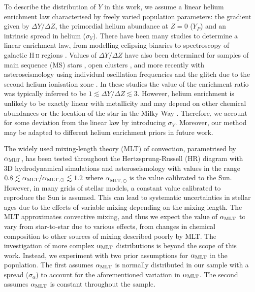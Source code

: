 To describe the distribution of $Y$ in this work, we assume a linear helium enrichment law characterised by freely varied population parameters: the gradient given by $\Delta Y / \Delta Z$, the primordial helium abundance at $Z=0$ ($Y_P$) and an intrinsic spread in helium ($\sigma_Y$). There have been many studies to determine a linear enrichment law, from modelling eclipsing binaries \citep{Ribas.Jordi.ea2000} to spectroscopy of galactic H\,\textsc{ii} regions \citep{Balser2006}. Values of $\Delta Y / \Delta Z$ have also been determined for samples of main sequence (MS) stars \citep{Casagrande.Flynn.ea2007}, open clusters \citep{Brogaard.VandenBerg.ea2012}, and more recently with asteroseismology using individual oscillation frequencies \citep{SilvaAguirre.Lund.ea2017} and the glitch due to the second helium ionisation zone \citep{Verma.Raodeo.ea2019}. In these studies the value of the enrichment ratio was typically inferred to be $1 \lesssim \Delta Y / \Delta Z \lesssim 3$. However, helium enrichment is unlikely to be exactly linear with metallicity and may depend on other chemical abundances \citep{West.Heger2013} or the location of the star in the Milky Way \citep{Frebel2010}. Therefore, we account for some deviation from the linear law by introducing $\sigma_Y$. Moreover, our method may be adapted to different helium enrichment priors in future work.

The widely used mixing-length theory (MLT) of convection, parametrised by ${\alpha_\mathrm{MLT}}$, has been tested throughout the Hertzsprung-Russell (HR) diagram with 3D hydrodynamical simulations \citep{Trampedach.Stein.ea2014, Magic.Weiss.ea2015} and asteroseismology \citep{Tayar.Somers.ea2017, Viani.Basu.ea2018, Li.Bedding.ea2018} with values in the range $0.8 \lesssim {\alpha_\mathrm{MLT}}/\alpha_{\mathrm{MLT}, \odot} \lesssim 1.2$ where $\alpha_{\mathrm{MLT}, \odot}$ is the value calibrated to the Sun. However, in many grids of stellar models, a constant value calibrated to reproduce the Sun is assumed. This can lead to systematic uncertainties in stellar ages due to the effects of variable mixing depending on the mixing length. The MLT approximates convective mixing, and thus we expect the value of ${\alpha_\mathrm{MLT}}$ to vary from star-to-star due to various effects, from changes in chemical composition to other sources of mixing described poorly by MLT. The investigation of more complex ${\alpha_\mathrm{MLT}}$ distributions is beyond the scope of this work. Instead, we experiment with two prior assumptions for ${\alpha_\mathrm{MLT}}$ in the population. The first assumes ${\alpha_\mathrm{MLT}}$ is normally distributed in our sample with a spread ($\sigma_\alpha$) to account for the aforementioned variation in ${\alpha_\mathrm{MLT}}$. The second assumes ${\alpha_\mathrm{MLT}}$ is constant throughout the sample.

